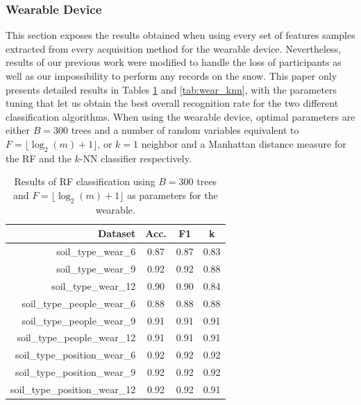 \documentclass[10pt,conference]{IEEEtran}
\begin{document}
\subsubsection{Wearable Device}
This section exposes the results obtained when using every set of features samples extracted from every acquisition method for the wearable device. Nevertheless, results of our previous work were modified to handle the loss of participants as well as our impossibility to perform any records on the snow. This paper only presents detailed results in Tables \ref{tab:wear_rf} and \ref{tab:wear_knn}, with the parameters tuning that let us obtain the best overall recognition rate for the two different classification algorithms. When using the wearable device, optimal parameters are either $B=300$ trees and a number of random variables equivalent to $F=\lfloor\log_2(m)+1\rfloor$, or $k = 1$ neighbor and a Manhattan distance measure for the RF and the $k$-NN classifier respectively.


\begin{table}[!ht]
	\centering
	\caption{Results of RF classification using $B=300$ trees and $F=\lfloor\log_2(m)+1\rfloor$ as parameters for the wearable.}
    \label{tab:wear_rf}
    \scalebox{0.75}
    {
        \begin{tabular}{rccc}
            \toprule
            	\textbf{Dataset}
            	&\textbf{Acc.}
            	&\textbf{F1}
            	&\textbf{k} \\
            \midrule
                soil\_type\_wear\_6             & 0.87 & 0.87 & 0.83 \\
                soil\_type\_wear\_9             & 0.92 & 0.92 & 0.88 \\
                soil\_type\_wear\_12            & 0.90 & 0.90 & 0.84 \\
                soil\_type\_people\_wear\_6     & 0.88 & 0.88 & 0.88 \\
                soil\_type\_people\_wear\_9     & 0.91 & 0.91 & \cellcolor{black!25}0.91 \\
                soil\_type\_people\_wear\_12    & 0.91 & 0.91 & 0.91 \\
                soil\_type\_position\_wear\_6   & 0.92 & 0.92 & 0.92 \\
                soil\_type\_position\_wear\_9   & 0.92 & 0.92 & \cellcolor{black!25}0.92 \\
                soil\_type\_position\_wear\_12  & 0.92 & 0.92 & 0.91 \\
            \bottomrule
        \end{tabular}
    }
\end{table}
\end{document}
